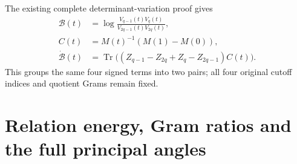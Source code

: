 \documentclass{article}
\newcommand{\Tr}{\operatorname{Tr}}
\begin{document}
The existing complete determinant-variation proof gives
\[
 \begin{aligned}
 \mathcal B(t)&=\log\frac{V_{q-1}(t)V_q(t)}
                              {V_{2q-1}(t)V_{2q}(t)},\\
 C(t)&=M(t)^{-1}(M(1)-M(0)),\\
 \dot{\mathcal B}(t)
 &=\Tr\bigl((Z_{q-1}-Z_{2q}+Z_q-Z_{2q-1})C(t)\bigr).
 \end{aligned}
 \tag{AGT4}
\]
This groups the same four signed terms into two pairs; all four
original cutoff indices and quotient Grams remain fixed.

\section{Relation energy, Gram ratios and the full principal angles}
\end{document}
